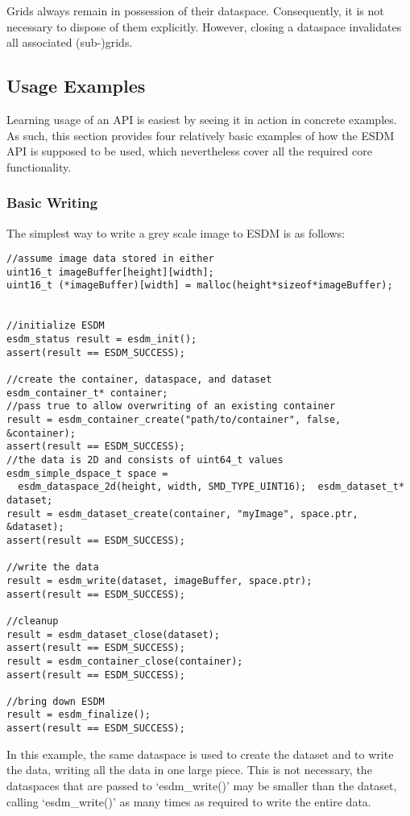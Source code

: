 Grids always remain in possession of their dataspace. Consequently, it
is not necessary to dispose of them explicitly. However, closing a
dataspace invalidates all associated (sub-)grids.

\subsection{Usage Examples}%

Learning usage of an API is easiest by seeing it in action in concrete
examples. As such, this section provides four relatively basic examples
of how the ESDM API is supposed to be used, which nevertheless cover all
the required core functionality.

\subsubsection{Basic Writing}%

The simplest way to write a grey scale image to ESDM is as follows:

\begin{lstlisting}
//assume image data stored in either
uint16_t imageBuffer[height][width];
uint16_t (*imageBuffer)[width] = malloc(height*sizeof*imageBuffer);


//initialize ESDM
esdm_status result = esdm_init();
assert(result == ESDM_SUCCESS);

//create the container, dataspace, and dataset
esdm_container_t* container;
//pass true to allow overwriting of an existing container
result = esdm_container_create("path/to/container", false, &container); 
assert(result == ESDM_SUCCESS);
//the data is 2D and consists of uint64_t values
esdm_simple_dspace_t space = 
  esdm_dataspace_2d(height, width, SMD_TYPE_UINT16);  esdm_dataset_t* dataset;
result = esdm_dataset_create(container, "myImage", space.ptr, &dataset);
assert(result == ESDM_SUCCESS);

//write the data
result = esdm_write(dataset, imageBuffer, space.ptr);
assert(result == ESDM_SUCCESS);

//cleanup
result = esdm_dataset_close(dataset);
assert(result == ESDM_SUCCESS);
result = esdm_container_close(container);
assert(result == ESDM_SUCCESS);

//bring down ESDM
result = esdm_finalize();
assert(result == ESDM_SUCCESS);
\end{lstlisting}

In this example, the same dataspace is used to create the dataset and to
write the data, writing all the data in one large piece. This is not
necessary, the dataspaces that are passed to `esdm\_write()' may be
smaller than the dataset, calling `esdm\_write()' as many times as
required to write the entire data.

